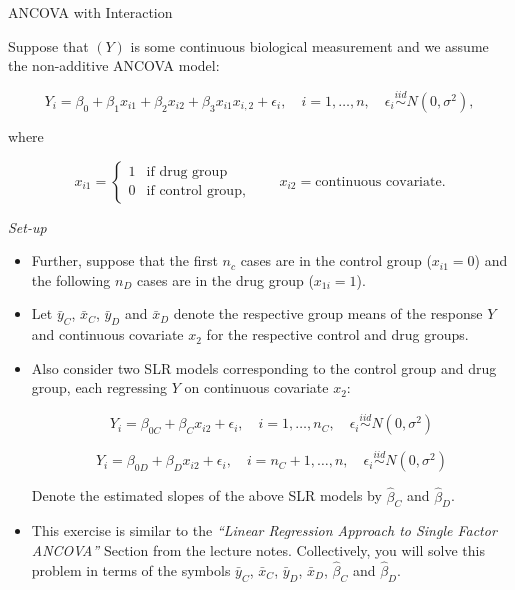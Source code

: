 \documentclass[letterpaper]{article}
\begin{document}
	{\color{deepred}  ANCOVA with Interaction}
	
	Suppose that $(Y)$ is some continuous biological measurement and we assume the non-additive ANCOVA model:
	
	\begin{equation}
		Y_i = \beta_0 + \beta_1 x_{i1} + \beta_2 x_{i2} + \beta_3 x_{i1} x_{i,2} + \epsilon_i, \quad i = 1, \ldots, n, \quad \epsilon_i \overset{iid}{\sim} N(0, \sigma^2),
	\end{equation}
	
	where
	
	\[
	x_{i1} = \begin{cases} 1 & \text{if drug group} \\ 0 & \text{if control group,} \end{cases} \qquad x_{i2} = \text{continuous covariate.}
	\]
	
	\textit{Set-up}
	
	\begin{itemize}
		\item Further, suppose that the first $n_c$ cases are in the control group ($x_{i1} = 0$) and the following $n_D$ cases are in the drug group ($x_{1i} = 1$).
		
		\item Let $\bar{y}_C$, $\bar{x}_C$, $\bar{y}_D$ and $\bar{x}_D$ denote the respective group means of the response $Y$ and continuous covariate $x_2$ for the respective control and drug groups.
		
		\item Also consider two SLR models corresponding to the control group and drug group, each regressing $Y$ on continuous covariate $x_2$:
		
		\[
		Y_i = \beta_{0C} + \beta_C x_{i2} + \epsilon_i, \quad i = 1, \ldots, n_C, \quad \epsilon_i \overset{iid}{\sim} N(0, \sigma^2)
		\]
		
		\[
		Y_i = \beta_{0D} + \beta_D x_{i2} + \epsilon_i, \quad i = n_C + 1, \ldots, n, \quad \epsilon_i \overset{iid}{\sim} N(0, \sigma^2)
		\]
		
		Denote the estimated slopes of the above SLR models by $\hat{\beta}_C$ and $\hat{\beta}_D$.
		
		\item This exercise is similar to the \textit{``Linear Regression Approach to Single Factor ANCOVA''} Section from the lecture notes. Collectively, you will solve this problem in terms of the symbols $\bar{y}_C$, $\bar{x}_C$, $\bar{y}_D$, $\bar{x}_D$, $\hat{\beta}_C$ and $\hat{\beta}_D$.
	\end{itemize}
\end{document}
